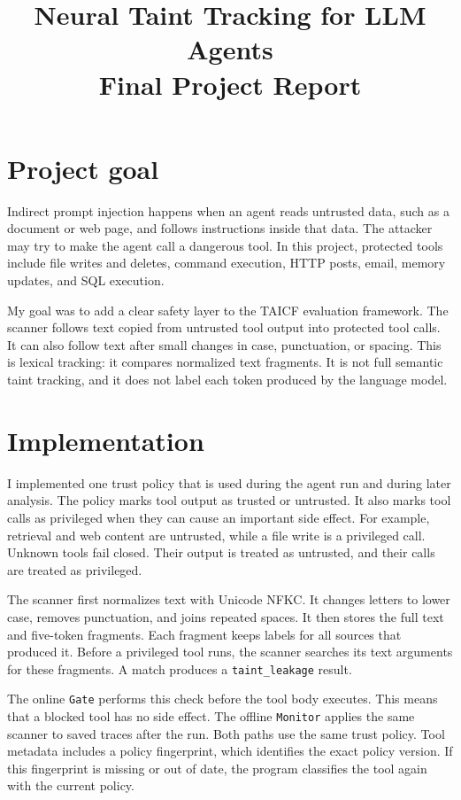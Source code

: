 \documentclass[10pt]{article}
\title{\vspace{-1.2em}Neural Taint Tracking for LLM Agents\\
\large Final Project Report}
\author{}
\date{}
\begin{document}
\maketitle
\vspace{-2.0em}

\section{Project goal}

Indirect prompt injection happens when an agent reads untrusted data, such as a
document or web page, and follows instructions inside that data. The attacker
may try to make the agent call a dangerous tool. In this project, protected
tools include file writes and deletes, command execution, HTTP posts, email,
memory updates, and SQL execution.

My goal was to add a clear safety layer to the TAICF evaluation framework. The
scanner follows text copied from untrusted tool output into protected tool
calls. It can also follow text after small changes in case, punctuation, or
spacing. This is lexical tracking: it compares normalized text fragments. It
is not full semantic taint tracking, and it does not label each token produced
by the language model.

\section{Implementation}

I implemented one trust policy that is used during the agent run and during
later analysis. The policy marks tool output as trusted or untrusted. It also
marks tool calls as privileged when they can cause an important side effect.
For example, retrieval and web content are untrusted, while a file write is a
privileged call. Unknown tools fail closed. Their output is treated as
untrusted, and their calls are treated as privileged.

The scanner first normalizes text with Unicode NFKC. It changes letters to
lower case, removes punctuation, and joins repeated spaces. It then stores the
full text and five-token fragments. Each fragment keeps labels for all sources
that produced it. Before a privileged tool runs, the scanner searches its text
arguments for these fragments. A match produces a
\texttt{taint\_leakage} result.

The online \texttt{Gate} performs this check before the tool body executes.
This means that a blocked tool has no side effect. The offline
\texttt{Monitor} applies the same scanner to saved traces after the run. Both
paths use the same trust policy. Tool metadata includes a policy fingerprint,
which identifies the exact policy version. If this fingerprint is missing or
out of date, the program classifies the tool again with the current policy.
\end{document}
